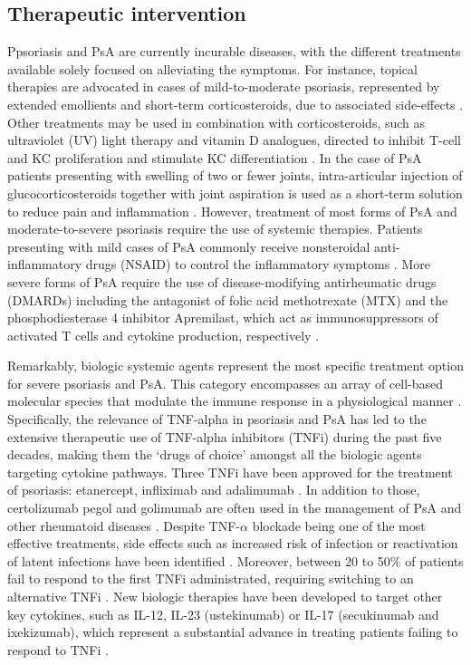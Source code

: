 \subsection{Therapeutic intervention}
Ppsoriasis and PsA are currently incurable diseases, with the different treatments available solely focused on alleviating the symptoms. For instance, topical therapies are advocated in cases of mild-to-moderate psoriasis, represented by extended emollients and short-term corticosteroids, due to associated side-effects \parencite{Menter2009}. Other treatments may be used in combination with corticosteroids, such as ultraviolet (UV) light therapy and vitamin D analogues, directed to inhibit T-cell and KC proliferation and stimulate KC differentiation \parencite{Rizova2001}. In the case of PsA patients presenting with swelling of two or fewer joints, intra-articular injection of glucocorticosteroids together with joint aspiration is used as a short-term solution to reduce pain and inflammation \parencite{Coates2016}. However, treatment of most forms of PsA and moderate-to-severe psoriasis require the use of systemic therapies. Patients presenting with mild cases of PsA commonly receive nonsteroidal anti-inflammatory drugs (NSAID) to control the inflammatory symptoms \parencite{Coates2016}. More severe forms of PsA require the use of disease-modifying antirheumatic drugs (DMARDs) including the antagonist of folic acid methotrexate (MTX) and the phosphodiesterase 4 inhibitor Apremilast, which act as immunosuppressors of activated T cells and cytokine production, respectively \parencite{Schmitt2014, Gossec2016, Keating2017,Polachek2017}.

Remarkably, biologic systemic agents represent the most specific treatment option for severe psoriasis and PsA. This category encompasses an array of cell-based molecular species that modulate the immune response in a physiological manner \parencite{Perera2012}. Specifically, the relevance of TNF-alpha in psoriasis and PsA has led to the extensive therapeutic use of TNF-alpha inhibitors (TNFi) during the past five decades, making them the ‘drugs of choice’ amongst all the biologic agents targeting cytokine pathways. Three TNFi have been approved for the treatment of psoriasis: etanercept, infliximab and adalimumab \parencite{Ahil2016}. In addition to those, certolizumab pegol and golimumab are often used in the management of PsA and other rheumatoid diseases \parencite{Coates2016b}. Despite TNF-$\alpha$ blockade being one of the most effective treatments, side effects such as increased risk of infection or reactivation of latent infections have been identified \parencite{Nickoloff2004}. Moreover, between 20 to 50\% of patients fail to respond to the first TNFi administrated, requiring switching to an alternative TNFi \parencite{Abramson2016}. New biologic therapies have been developed to target other key cytokines, such as IL-12, IL-23 (ustekinumab) or IL-17 (secukinumab and ixekizumab), which represent a substantial advance in treating patients failing to respond to TNFi \parencite{Mahil2016, Coates2016b}.

